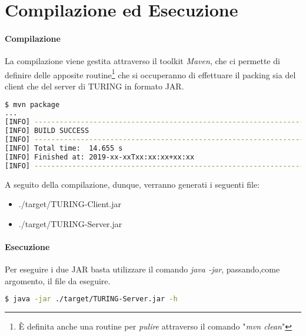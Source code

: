 \section{Compilazione ed Esecuzione}
\paragraph{Compilazione}
La compilazione viene gestita attraverso il toolkit \textit{Maven}, che ci permette di definire delle apposite routine\footnote{È definita anche una routine per \textit{pulire} attraverso il comando "\textit{mvn clean}"} che si occuperanno di effettuare il packing sia del client che del server di TURING in formato JAR.

\begin{lstlisting}[language=bash, caption="Compilazione tramite Maven"]
$ mvn package
...
[INFO] -------------------------------------------------------------------
[INFO] BUILD SUCCESS
[INFO] -------------------------------------------------------------------
[INFO] Total time:  14.655 s
[INFO] Finished at: 2019-xx-xxTxx:xx:xx+xx:xx
[INFO] -------------------------------------------------------------------
\end{lstlisting}
\pagebreak
A seguito della compilazione, dunque, verranno generati i seguenti file:
\begin{itemize}
	\item ./target/TURING-Client.jar
	\item ./target/TURING-Server.jar
\end{itemize}

\paragraph{Esecuzione}
Per eseguire i due JAR basta utilizzare il comando \textit{java -jar}, passando,come argomento, il file da eseguire.

\begin{lstlisting}[language=bash, caption="Esempio di esecuzione di TURING-Server.jar]
$ java -jar ./target/TURING-Server.jar -h
\end{lstlisting}

